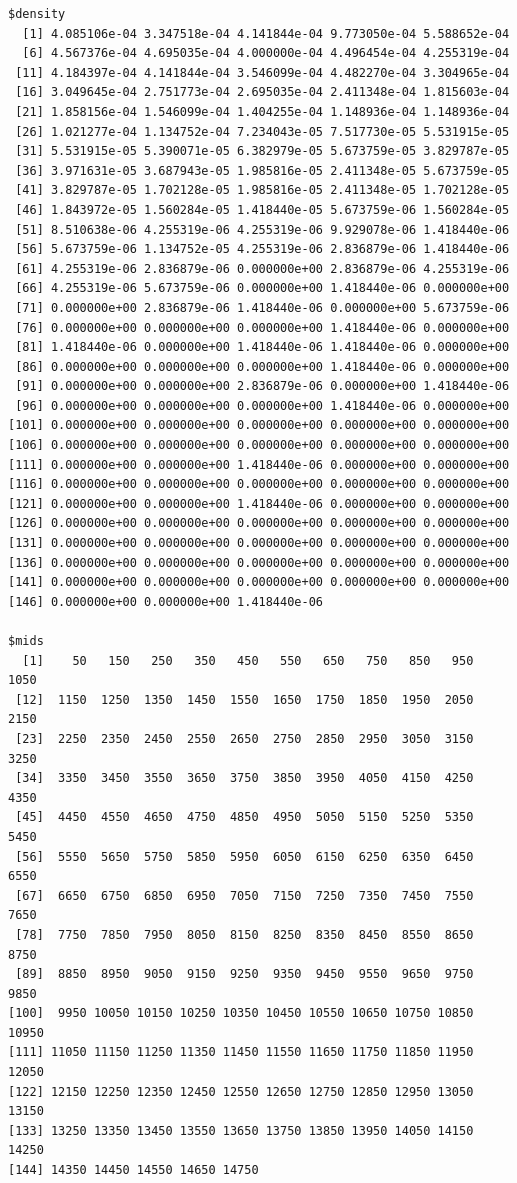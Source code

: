 \documentclass[]{article}
\begin{document}
\begin{verbatim}
$density
  [1] 4.085106e-04 3.347518e-04 4.141844e-04 9.773050e-04 5.588652e-04
  [6] 4.567376e-04 4.695035e-04 4.000000e-04 4.496454e-04 4.255319e-04
 [11] 4.184397e-04 4.141844e-04 3.546099e-04 4.482270e-04 3.304965e-04
 [16] 3.049645e-04 2.751773e-04 2.695035e-04 2.411348e-04 1.815603e-04
 [21] 1.858156e-04 1.546099e-04 1.404255e-04 1.148936e-04 1.148936e-04
 [26] 1.021277e-04 1.134752e-04 7.234043e-05 7.517730e-05 5.531915e-05
 [31] 5.531915e-05 5.390071e-05 6.382979e-05 5.673759e-05 3.829787e-05
 [36] 3.971631e-05 3.687943e-05 1.985816e-05 2.411348e-05 5.673759e-05
 [41] 3.829787e-05 1.702128e-05 1.985816e-05 2.411348e-05 1.702128e-05
 [46] 1.843972e-05 1.560284e-05 1.418440e-05 5.673759e-06 1.560284e-05
 [51] 8.510638e-06 4.255319e-06 4.255319e-06 9.929078e-06 1.418440e-06
 [56] 5.673759e-06 1.134752e-05 4.255319e-06 2.836879e-06 1.418440e-06
 [61] 4.255319e-06 2.836879e-06 0.000000e+00 2.836879e-06 4.255319e-06
 [66] 4.255319e-06 5.673759e-06 0.000000e+00 1.418440e-06 0.000000e+00
 [71] 0.000000e+00 2.836879e-06 1.418440e-06 0.000000e+00 5.673759e-06
 [76] 0.000000e+00 0.000000e+00 0.000000e+00 1.418440e-06 0.000000e+00
 [81] 1.418440e-06 0.000000e+00 1.418440e-06 1.418440e-06 0.000000e+00
 [86] 0.000000e+00 0.000000e+00 0.000000e+00 1.418440e-06 0.000000e+00
 [91] 0.000000e+00 0.000000e+00 2.836879e-06 0.000000e+00 1.418440e-06
 [96] 0.000000e+00 0.000000e+00 0.000000e+00 1.418440e-06 0.000000e+00
[101] 0.000000e+00 0.000000e+00 0.000000e+00 0.000000e+00 0.000000e+00
[106] 0.000000e+00 0.000000e+00 0.000000e+00 0.000000e+00 0.000000e+00
[111] 0.000000e+00 0.000000e+00 1.418440e-06 0.000000e+00 0.000000e+00
[116] 0.000000e+00 0.000000e+00 0.000000e+00 0.000000e+00 0.000000e+00
[121] 0.000000e+00 0.000000e+00 1.418440e-06 0.000000e+00 0.000000e+00
[126] 0.000000e+00 0.000000e+00 0.000000e+00 0.000000e+00 0.000000e+00
[131] 0.000000e+00 0.000000e+00 0.000000e+00 0.000000e+00 0.000000e+00
[136] 0.000000e+00 0.000000e+00 0.000000e+00 0.000000e+00 0.000000e+00
[141] 0.000000e+00 0.000000e+00 0.000000e+00 0.000000e+00 0.000000e+00
[146] 0.000000e+00 0.000000e+00 1.418440e-06

$mids
  [1]    50   150   250   350   450   550   650   750   850   950  1050
 [12]  1150  1250  1350  1450  1550  1650  1750  1850  1950  2050  2150
 [23]  2250  2350  2450  2550  2650  2750  2850  2950  3050  3150  3250
 [34]  3350  3450  3550  3650  3750  3850  3950  4050  4150  4250  4350
 [45]  4450  4550  4650  4750  4850  4950  5050  5150  5250  5350  5450
 [56]  5550  5650  5750  5850  5950  6050  6150  6250  6350  6450  6550
 [67]  6650  6750  6850  6950  7050  7150  7250  7350  7450  7550  7650
 [78]  7750  7850  7950  8050  8150  8250  8350  8450  8550  8650  8750
 [89]  8850  8950  9050  9150  9250  9350  9450  9550  9650  9750  9850
[100]  9950 10050 10150 10250 10350 10450 10550 10650 10750 10850 10950
[111] 11050 11150 11250 11350 11450 11550 11650 11750 11850 11950 12050
[122] 12150 12250 12350 12450 12550 12650 12750 12850 12950 13050 13150
[133] 13250 13350 13450 13550 13650 13750 13850 13950 14050 14150 14250
[144] 14350 14450 14550 14650 14750


\end{verbatim}
\end{document}
